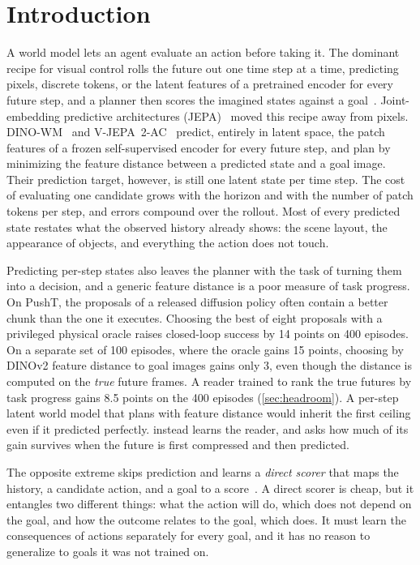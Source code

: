 \section{Introduction}
\label{sec:intro}

A world model lets an agent evaluate an action before taking it.
The dominant recipe for visual control rolls the future out one time step at a time, predicting pixels, discrete tokens, or the latent features of a pretrained encoder for every future step, and a planner then scores the imagined states against a goal~\cite{hafner2019planet,micheli2023iris,zhou2025dinowm,assran2025vjepa2}.
Joint-embedding predictive architectures (JEPA)~\cite{lecun2022path,assran2023ijepa} moved this recipe away from pixels.
DINO-WM~\cite{zhou2025dinowm} and V-JEPA~2-AC~\cite{assran2025vjepa2} predict, entirely in latent space, the patch features of a frozen self-supervised encoder for every future step, and plan by minimizing the feature distance between a predicted state and a goal image.
Their prediction target, however, is still one latent state per time step.
The cost of evaluating one candidate grows with the horizon and with the number of patch tokens per step, and errors compound over the rollout.
Most of every predicted state restates what the observed history already shows: the scene layout, the appearance of objects, and everything the action does not touch.

Predicting per-step states also leaves the planner with the task of turning them into a decision, and a generic feature distance is a poor measure of task progress.
On PushT, the proposals of a released diffusion policy often contain a better chunk than the one it executes.
Choosing the best of eight proposals with a privileged physical oracle raises closed-loop success by 14 points on 400 episodes.
On a separate set of 100 episodes, where the oracle gains 15 points, choosing by DINOv2 feature distance to goal images gains only 3, even though the distance is computed on the \emph{true} future frames.
A reader trained to rank the true futures by task progress gains 8.5 points on the 400 episodes (\cref{sec:headroom}).
A per-step latent world model that plans with feature distance would inherit the first ceiling even if it predicted perfectly.
\method instead learns the reader, and asks how much of its gain survives when the future is first compressed and then predicted.

The opposite extreme skips prediction and learns a \emph{direct scorer} that maps the history, a candidate action, and a goal to a score~\cite{nakamoto2024vgps}.
A direct scorer is cheap, but it entangles two different things: what the action will do, which does not depend on the goal, and how the outcome relates to the goal, which does.
It must learn the consequences of actions separately for every goal, and it has no reason to generalize to goals it was not trained on.

